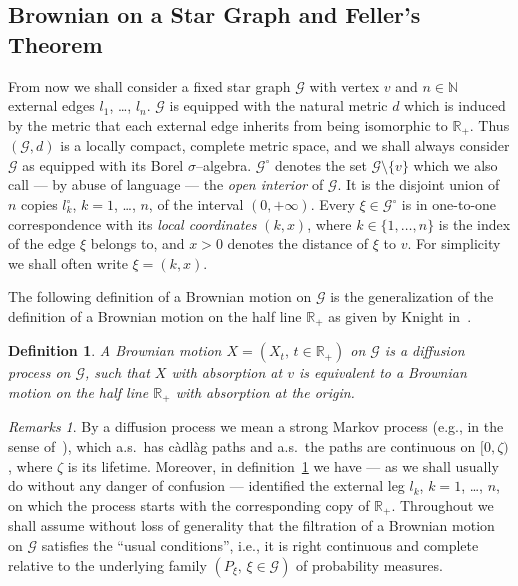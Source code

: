 \documentclass[11pt,a4paper]{amsart}
\newcommand{\gs}{\sigma}
\newcommand{\cG}{\mathcal{G}}
\newcommand{\1}{1}
\newcommand{\N}{\mathbb{N}}
\newcommand{\R}{\mathbb{R}}
\newtheorem{definition}[theorem]{Definition}
\theoremstyle{remark}
\newtheorem{remarks}[theorem]{Remarks}
\numberwithin{equation}{section}
\begin{document}
\subsection{Brownian on a Star Graph and Feller's Theorem}   \label{ssect1.1}
From now we shall consider a fixed star graph $\cG$ with vertex $v$ and $n\in\N$
external edges $l_1$, \dots, $l_n$. $\cG$ is equipped with the natural metric
$d$ which is induced by the metric that each external edge inherits from being
isomorphic to $\R_+$. Thus $(\cG,d)$ is a locally compact, complete metric space,
and we shall always consider $\cG$ as equipped with its Borel $\gs$--algebra.
$\cG^\circ$ denotes the set $\cG\setminus\{v\}$ which we also call --- by abuse
of language --- the \emph{open interior} of $\cG$. It is the disjoint union of $n$
copies $l_k^\circ$, $k=1$, \dots, $n$, of the interval $(0,+\infty)$. Every
$\xi\in\cG^\circ$ is in one-to-one correspondence with its \emph{local coordinates}
$(k,x)$, where $k\in\{1,\dotsc,n\}$ is the index of the edge $\xi$ belongs to, and
$x>0$ denotes the distance of $\xi$ to $v$. For simplicity we shall often write
$\xi=(k,x)$.

The following definition of a Brownian motion on $\cG$ is the generalization of
the definition of a Brownian motion on the half line $\R_+$ as
given by Knight in~\cite[Chapter~6]{Kn81}.

\begin{definition}	\label{def_BM}
A \emph{Brownian motion} $X=(X_t,\,t\in\R_+)$ on $\cG$ is a diffusion process on
$\cG$, such that $X$ with absorption at $v$ is equivalent to a Brownian motion
on the half line $\R_+$ with absorption at the origin.
\end{definition}

\begin{remarks}	\label{rem_BM}
By a diffusion process we mean a strong Markov process (e.g., in the sense of~\cite{BlGe68}),
which a.s.\ has c\`adl\`ag paths and a.s.\ the paths are continuous on $[0,\zeta)$, where
$\zeta$ is its lifetime. Moreover, in definition~\ref{def_BM} we have --- as we shall
usually do without any danger of confusion --- identified the external leg
$l_k$, $k=1$, \dots, $n$, on which the process starts with the corresponding copy
of $\R_+$. Throughout we shall assume without loss of generality that the filtration
of a Brownian motion on $\cG$ satisfies the ``usual conditions'', i.e., it is right
continuous and complete relative to the underlying family $(P_\xi,\,\xi\in\cG)$
of probability measures.
\end{remarks}
\end{document}

